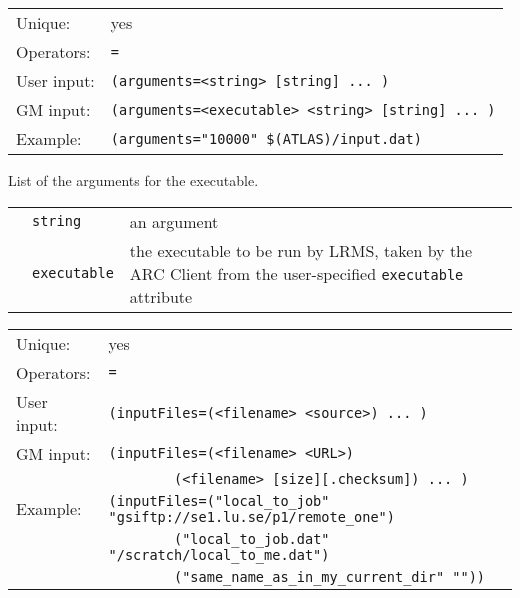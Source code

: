   \hspace*{0.5cm}
  \begin{shaded}
  \end{shaded}
  \begin{tabular}{lp{13cm}}
    Unique:&yes\\
    Operators:&\verb#=#\\
    User input:&\verb#(arguments=<string> [string] ... )#\\
    GM input:&\verb#(arguments=<executable> <string> [string] ... )#\\
    Example:&\verb#(arguments="10000" $(ATLAS)/input.dat)#\\ %
  \end{tabular}

  List of the arguments for the executable.

  \begin{tabular}{llp{10cm}}
    \hspace*{1cm}&\texttt{string}&an argument\\
    \hspace*{1cm}&\texttt{executable}&the executable to be run by LRMS, taken by the
    ARC Client from the user-specified \texttt{executable} attribute\\
  \end{tabular}

  \hspace*{0.5cm}
  \begin{shaded}
  \end{shaded}
  \begin{tabular}{lp{12cm}}
    Unique:&yes\\
    Operators:&\verb#=#\\
    User input:&\verb#(inputFiles=(<filename> <source>) ... )#\\
    GM input:&\verb#(inputFiles=(<filename> <URL>)#\\
    &\verb#        (<filename> [size][.checksum]) ... )#\\
    Example:&\verb#(inputFiles=("local_to_job" "gsiftp://se1.lu.se/p1/remote_one")#\\
    &\verb#        ("local_to_job.dat" "/scratch/local_to_me.dat")#\\
    &\verb#        ("same_name_as_in_my_current_dir" ""))#\\
  \end{tabular}

